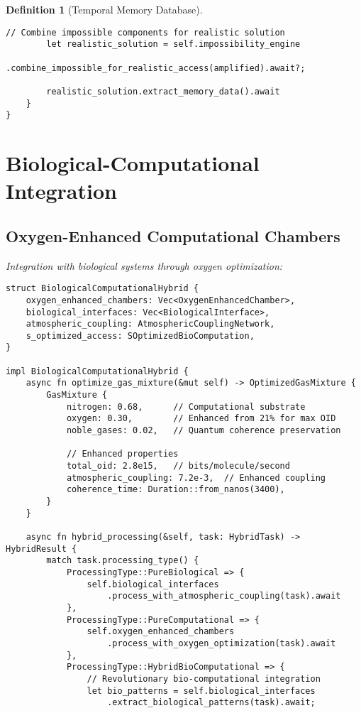 \documentclass[12pt]{article}
\newtheorem{definition}[theorem]{Definition}
\begin{document}
\begin{definition}[Temporal Memory Database]
\begin{lstlisting}[caption=S-Constant Memory Optimization]
        // Combine impossible components for realistic solution
        let realistic_solution = self.impossibility_engine
            .combine_impossible_for_realistic_access(amplified).await?;
        
        realistic_solution.extract_memory_data().await
    }
}
\end{lstlisting}

\section{Biological-Computational Integration}

\subsection{Oxygen-Enhanced Computational Chambers}

Integration with biological systems through oxygen optimization:

\begin{lstlisting}[caption=Bio-Compatible Computation]
struct BiologicalComputationalHybrid {
    oxygen_enhanced_chambers: Vec<OxygenEnhancedChamber>,
    biological_interfaces: Vec<BiologicalInterface>,
    atmospheric_coupling: AtmosphericCouplingNetwork,
    s_optimized_access: SOptimizedBioComputation,
}

impl BiologicalComputationalHybrid {
    async fn optimize_gas_mixture(&mut self) -> OptimizedGasMixture {
        GasMixture {
            nitrogen: 0.68,      // Computational substrate
            oxygen: 0.30,        // Enhanced from 21% for max OID
            noble_gases: 0.02,   // Quantum coherence preservation
            
            // Enhanced properties
            total_oid: 2.8e15,   // bits/molecule/second
            atmospheric_coupling: 7.2e-3,  // Enhanced coupling
            coherence_time: Duration::from_nanos(3400),
        }
    }
    
    async fn hybrid_processing(&self, task: HybridTask) -> HybridResult {
        match task.processing_type() {
            ProcessingType::PureBiological => {
                self.biological_interfaces
                    .process_with_atmospheric_coupling(task).await
            },
            ProcessingType::PureComputational => {
                self.oxygen_enhanced_chambers
                    .process_with_oxygen_optimization(task).await  
            },
            ProcessingType::HybridBioComputational => {
                // Revolutionary bio-computational integration
                let bio_patterns = self.biological_interfaces
                    .extract_biological_patterns(task).await;
                

\end{lstlisting}
\end{definition}
\end{document}
